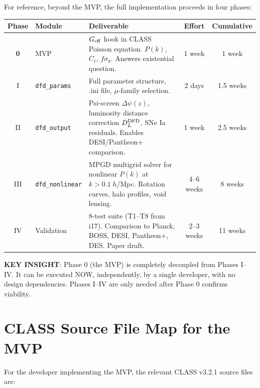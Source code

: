 \documentclass[11pt]{article}
\theoremstyle{definition}
\theoremstyle{remark}
\newcommand{\Geff}{G_{\rm eff}}
\begin{document}
For reference, beyond the MVP, the full implementation proceeds in
four phases:

\begin{center}
\begin{tabular}{clp{6cm}cc}
\toprule
Phase & Module & Deliverable & Effort & Cumulative \\
\midrule
\textbf{0} & MVP & $\Geff$ hook in CLASS Poisson equation.
  $P(k)$, $C_\ell$, $f\sigma_8$. Answers existential question. & 1 week & 1 week \\
\addlinespace
I & \texttt{dfd\_params} & Full parameter structure, .ini file,
  $\mu$-family selection. & 2 days & 1.5 weeks \\
\addlinespace
II & \texttt{dfd\_output} & Psi-screen $\Delta\psi(z)$, luminosity
  distance correction $D_L^{\rm DFD}$, SNe Ia residuals.
  Enables DESI/Pantheon+ comparison. & 1 week & 2.5 weeks \\
\addlinespace
III & \texttt{dfd\_nonlinear} & MPGD multigrid solver for nonlinear
  $P(k)$ at $k > 0.1\;h$/Mpc. Rotation curves, halo profiles,
  void lensing. & 4--6 weeks & 8 weeks \\
\addlinespace
IV & Validation & 8-test suite (T1--T8 from i17). Comparison to
  Planck, BOSS, DESI, Pantheon+, DES. Paper draft. & 2--3 weeks & 11 weeks \\
\bottomrule
\end{tabular}
\end{center}

\textbf{KEY INSIGHT}: Phase 0 (the MVP) is completely decoupled
from Phases I--IV. It can be executed NOW, independently, by a
single developer, with no design dependencies. Phases I--IV are
only needed after Phase 0 confirms viability.

\section{CLASS Source File Map for the MVP}
\label{sec:classfiles}

For the developer implementing the MVP, the relevant CLASS v3.2.1
source files are:
\end{document}
